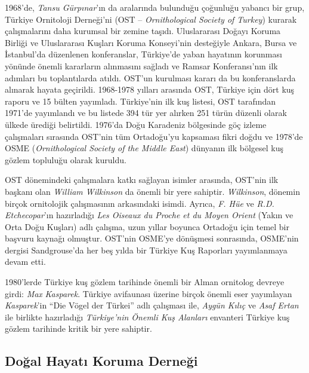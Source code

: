 \documentclass[
  a4paper,
  DIV=11,
  numbers=noendperiod]{scrreprt}
\begin{document}
1968'de, \emph{Tansu Gürpınar}'ın da aralarında bulunduğu çoğunluğu
yabancı bir grup, Türkiye Ornitoloji Derneği'ni (OST --
\emph{Ornithological Society of Turkey}) kurarak çalışmalarını daha
kurumsal bir zemine taşıdı. Uluslararası Doğayı Koruma Birliği ve
Uluslararası Kuşları Koruma Konseyi'nin desteğiyle Ankara, Bursa ve
İstanbul'da düzenlenen konferanslar, Türkiye'de yaban hayatının
korunması yönünde önemli kararların alınmasını sağladı ve Ramsar
Konferansı'nın ilk adımları bu toplantılarda atıldı. OST'un kurulması
kararı da bu konferanslarda alınarak hayata geçirildi. 1968-1978 yılları
arasında OST, Türkiye için dört kuş raporu ve 15 bülten yayımladı.
Türkiye'nin ilk kuş listesi, OST tarafından 1971'de yayımlandı ve bu
listede 394 tür yer alırken 251 türün düzenli olarak ülkede ürediği
belirtildi. 1976'da Doğu Karadeniz bölgesinde göç izleme çalışmaları
sırasında OST'nin tüm Ortadoğu'yu kapsaması fikri doğdu ve 1978'de OSME
(\emph{Ornithological Society of the Middle East}) dünyanın ilk bölgesel
kuş gözlem topluluğu olarak kuruldu.

OST dönemindeki çalışmalara katkı sağlayan isimler arasında, OST'nin ilk
başkanı olan \emph{William Wilkinson} da önemli bir yere sahiptir.
\emph{Wilkinson}, dönemin birçok ornitolojik çalışmasının arkasındaki
isimdi. Ayrıca, \emph{F. Hüe} ve \emph{R.D. Etchecopar}'ın hazırladığı
\emph{Les Oiseaux du Proche et du Moyen Orient} (Yakın ve Orta Doğu
Kuşları) adlı çalışma, uzun yıllar boyunca Ortadoğu için temel bir
başvuru kaynağı olmuştur. OST'nin OSME'ye dönüşmesi sonrasında, OSME'nin
dergisi Sandgrouse'da her beş yılda bir Türkiye Kuş Raporları
yayımlanmaya devam etti.

1980'lerde Türkiye kuş gözlem tarihinde önemli bir Alman ornitolog
devreye girdi: \emph{Max} \emph{Kasparek}. Türkiye avifaunası üzerine
birçok önemli eser yayımlayan \emph{Kasparek}'in ``Die Vögel der
Türkei'' adlı çalışması ile, \emph{Aygün Kılıç} ve \emph{Asaf Ertan} ile
birlikte hazırladığı \emph{Türkiye'nin Önemli Kuş Alanları} envanteri
Türkiye kuş gözlem tarihinde kritik bir yere sahiptir.

\subsection*{Doğal Hayatı Koruma
Derneği}\label{doux11fal-hayatux131-koruma-derneux11fi}
\end{document}
